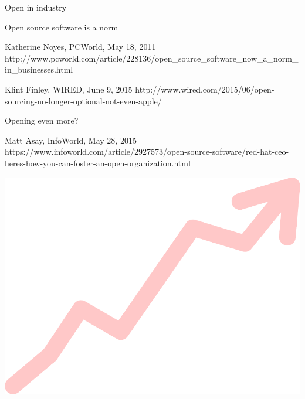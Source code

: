 \documentclass[xcolor={dvipsnames,usenames},beamer,aspectratio=169]{beamer}
\begin{document}
\begin{frame}{Open in industry}

\begin{block}{Open source software is a norm}

%
  {Katherine Noyes, PCWorld, May 18, 2011}%
  {http://www.pcworld.com/article/228136/open_source_software_now_a_norm_in_businesses.html}

%
  {Klint Finley, WIRED, June 9, 2015}%
  {http://www.wired.com/2015/06/open-sourcing-no-longer-optional-not-even-apple/}

\end{block}

\begin{block}{Opening even more?}

%
  {Matt Asay, InfoWorld, May 28, 2015}%
  {https://www.infoworld.com/article/2927573/open-source-software/red-hat-ceo-heres-how-you-can-foster-an-open-organization.html}

\end{block}

\centering
\includegraphics[height=0.2\textheight]{./images/general/growing}%

\end{frame}
\end{document}
